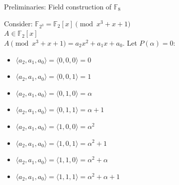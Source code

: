 \documentclass[xcolor=dvipsnames]{beamer}
\begin{document}
\begin{frame}{Preliminaries: Field construction of $\mathbb{F}_8$}

Consider: $\mathbb{F}_{2^3}= \mathbb{F}_{2}[x] \pmod {x^3 + x +
  1}$\\ $A \in \mathbb{F}_{2}[x]$ \\ 
$A \pmod {x^3 + x + 1} = a_2 x^2 + a_1 x + a_0$. Let $P(\alpha) = 0$:

\begin{itemize}
\item $\langle a_2, a_1, a_0 \rangle = \langle 0, 0, 0\rangle = 0$
\item $\langle a_2, a_1, a_0 \rangle = \langle 0, 0, 1\rangle = 1$
\item $\langle a_2, a_1, a_0 \rangle = \langle 0, 1, 0\rangle = \alpha$
\item $\langle a_2, a_1, a_0 \rangle = \langle 0, 1, 1\rangle = \alpha
  + 1$
\item $\langle a_2, a_1, a_0 \rangle = \langle 1, 0, 0\rangle = \alpha^2$
\item $\langle a_2, a_1, a_0 \rangle = \langle 1, 0, 1\rangle =
  \alpha^2 + 1$
\item $\langle a_2, a_1, a_0 \rangle = \langle 1, 1, 0\rangle =
  \alpha^2 + \alpha$
\item $\langle a_2, a_1, a_0 \rangle = \langle 1, 1, 1\rangle =
  \alpha^2 + \alpha + 1$
\end{itemize}
\end{frame}
\end{document}
